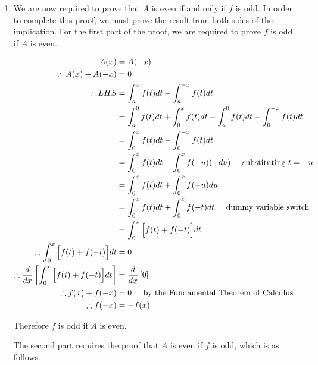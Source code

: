 \documentclass[a4paper]{article}
\begin{document}
\begin{enumerate}[label=\textbf{\arabic*.}]
\begin{enumerate}
		\bigbreak

		\begin{enumerate}

		\item We are now required to prove that $\displaystyle{A}$ is even if and only if $\displaystyle{f}$ is odd. In order to complete this proof, we must prove the result from both sides of the implication. For the first part of the proof, we are required to prove $\displaystyle{f}$ is odd if $\displaystyle{A}$ is even.

		\begin{align*}
		A(x) & = A(-x)\\
		\therefore A(x) - A(-x) & = 0\\
		\therefore LHS & = \int_{a}^{x}f(t)dt - \int_{a}^{-x}f(t)dt\\
		& = \int_{a}^{0}f(t)dt + \int_{0}^{x}f(t)dt - \int_{a}^{0}f(t)dt - \int_{0}^{-x}f(t)dt\\
		& = \int_{0}^{x}f(t)dt - \int_{0}^{-x}f(t)dt\\
		& = \int_{0}^{x}f(t)dt - \int_{0}^{x}f(-u)(-du) \hspace{5mm} \text{substituting $\displaystyle{t=-u}$}\\
		& = \int_{0}^{x}f(t)dt + \int_{0}^{x}f(-u)du\\
		& = \int_{0}^{x}f(t)dt + \int_{0}^{x}f(-t)dt \hspace{5mm} \text{dummy variable switch}\\
		& = \int_{0}^{x}\Big[f(t) + f(-t)\Big]dt\\
		\therefore \int_{0}^{x}\Big[f(t) + f(-t)\Big]dt & = 0\\
		\therefore \frac{d}{dx}\left[\int_{0}^{x}\Big[f(t) + f(-t)\Big]dt \right] & = \frac{d}{dx}\left[0\right]\\
		\therefore f(x) + f(-x) & = 0 \hspace{5mm} \text{by the Fundamental Theorem of Calculus}\\
		\therefore f(-x) & = -f(x)\\ 
		\end{align*}

		Therefore $\displaystyle{f}$ is odd if $\displaystyle{A}$ is even.

		\pagebreak

		The second part requires the proof that $\displaystyle{A}$ is even if $\displaystyle{f}$ is odd, which is as follows.


\end{enumerate}
\end{enumerate}
\end{enumerate}
\end{document}
